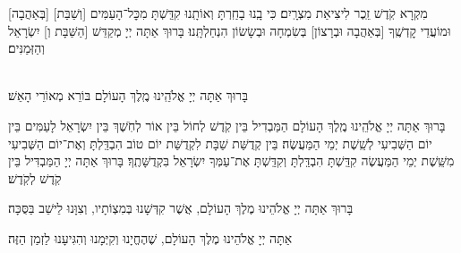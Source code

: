 \documentclass[twoside, openany, parskip=half, 11pt]{book}
\begin{document}
[בְּאַהֲבָה] מִקְרָא קֹֽדֶשׁ זֵֽכֶר לִיצִיאַת מִצְרָֽיִם׃ כִּי בָֽנוּ בָחַֽרְתָּ וְאוֹתָֽנוּ קִדַּֽשְׁתָּ מִכׇּל־הָעַמִּים [וְשַׁבַּת] וּמוֹעֲדֵי קׇדְשֶֽׁךָ [בְּאַהֲבָה וּבְרָצוֹן] בְּשִׂמְחָה וּבְשָׂשׂוֹן הִנְחַלְתָּֽנוּ׃ בָּרוּךְ אַתָּה יְיָ מְקַדֵּשׁ [הַשַּׁבָּת וְ] יִשְׂרָאֵל וְהַזְּמַנִּים׃

\begin{sometimes}

\\
בָּרוּךְ אַתָּה יְיָ אֱלֹהֵֽינוּ מֶֽלֶךְ הָעוֹלָם בּוֹרֵא מְאוֹרֵי הָאֵשׁ׃

בָּרוּךְ אַתָּה יְיָ אֱלֹהֵֽינוּ מֶֽלֶךְ הָעוֹלָם הַמַּבְדִיל בֵּין קֹֽדֶשׁ לְחוֹל בֵּין אוֹר לְחֹֽשֶׁךְ בֵּין יִשְׂרָאֵל לָעַמִּים בֵּין יוֹם הַשְּׁבִיעִי לְשֵֽׁשֶׁת יְמֵי הַמַּעֲשֶׂה׃ בֵּין קְדֻשַּׁת שַׁבָּת לִקְדֻשַּׁת יוֹם טוֹב הִבְדַּֽלְתָּ וְאֶת־יוֹם הַשְּׁבִיעִי מִשֵּֽׁשֶׁת יְמֵי הַמַּעֲשֶׂה קִדַּֽשְׁתָּ הִבְדַּֽלְתָּ וְקִדַּֽשְׁתָּ אֶת־עַמְּךָ יִשְׂרָאֵל בִּקְדֻשָּׁתֶֽךָ׃ בָּרוּךְ אַתָּה יְיָ הַמַּבְדִּיל בֵּין קֹֽדֶשׁ לְקֹֽדֶשׁ׃

\end{sometimes}



\vspace{-.5\baselineskip}
בָּרוּךְ אַתָּה יְיָ אֱלֹהֵינוּ מֶלֶךְ הָעוֹלָם, אֲשֶׁר קִדְּשָׁנוּ בְּמִצְוֹתָיו, וְצִוָּנוּ לֵישֵׁב בַּסֻּכָּה׃

אַתָּה יְיָ אֱלֹהֵינוּ מֶלֶךְ הָעוֹלָם, שֶׁהֶחֱיָנוּ וְקִיְּמָנוּ וְהִגִּיעָנוּ לַזְמַן הַזֶּה׃
\end{document}
